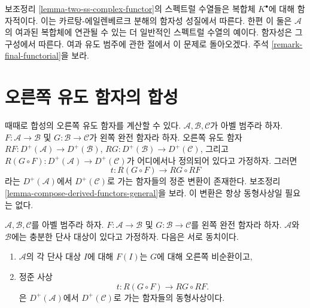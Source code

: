 \begin{remark}
\label{remark-functorial-ss}
보조정리 \ref{lemma-two-ss-complex-functor}의 스펙트럴 수열들은
복합체 $K^\bullet$에 대해 함자적이다. 이는 카르탕-에일렌베르크
분해의 함자성 성질에서 따른다. 한편 이 둘은 $\mathcal{A}$의 여과된
복합체에 연관될 수 있는 더 일반적인 스펙트럴 수열의 예이다.
함자성은 그 구성에서 따른다. 여과 유도 범주에 관한 절에서 이 문제로
돌아오겠다. 주석 \ref{remark-final-functorial}을 보라.
\end{remark}

\section{오른쪽 유도 함자의 합성}
\label{section-composition-right-derived-functors}

\noindent
때때로 합성의 오른쪽 유도 함자를 계산할 수 있다.
$\mathcal{A}, \mathcal{B}, \mathcal{C}$가 아벨 범주라 하자.
$F : \mathcal{A} \to \mathcal{B}$ 및 $G : \mathcal{B} \to \mathcal{C}$가
왼쪽 완전 함자라 하자. 오른쪽 유도 함자
$RF : D^{+}(\mathcal{A}) \to D^{+}(\mathcal{B})$,
$RG : D^{+}(\mathcal{B}) \to D^{+}(\mathcal{C})$, 그리고
$R(G \circ F) : D^{+}(\mathcal{A}) \to D^{+}(\mathcal{C})$가
어디에서나 정의되어 있다고 가정하자. 그러면
$$
t : R(G \circ F) \longrightarrow RG \circ RF
$$
라는 $D^{+}(\mathcal{A})$에서 $D^{+}(\mathcal{C})$로 가는 함자들의
정준 변환이 존재한다. 보조정리
\ref{lemma-compose-derived-functors-general}을 보라.
이 변환은 항상 동형사상일 필요는 없다.

\begin{lemma}
\label{lemma-compose-derived-functors}
$\mathcal{A}, \mathcal{B}, \mathcal{C}$를 아벨 범주라 하자.
$F : \mathcal{A} \to \mathcal{B}$ 및 $G : \mathcal{B} \to \mathcal{C}$를
왼쪽 완전 함자라 하자. $\mathcal{A}$와 $\mathcal{B}$에는 충분한 단사
대상이 있다고 가정하자. 다음은 서로 동치이다.
\begin{enumerate}
\item $\mathcal{A}$의 각 단사 대상 $I$에 대해 $F(I)$는 $G$에 대해
오른쪽 비순환이고,
\item 정준 사상
$$
t : R(G \circ F) \longrightarrow RG \circ RF.
$$
은 $D^{+}(\mathcal{A})$에서 $D^{+}(\mathcal{C})$로 가는 함자들의
동형사상이다.
\end{enumerate}
\end{lemma}

